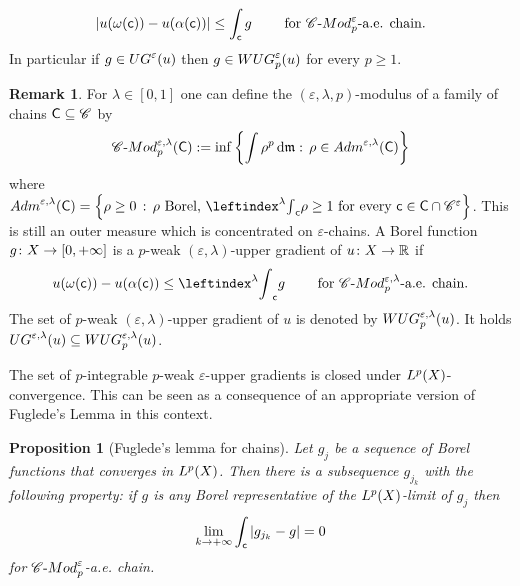 \documentclass[12pt]{amsart}
\newcommand{\R}{\mathbb{R}}
\renewcommand{\d}{{\mathrm d}}
\newcommand{\X}{{\rm X}}
\newcommand{\mm}{\mathfrak m}
\newtheorem{proposition}[theorem]{Proposition}
\theoremstyle{definition}
\newtheorem{remark}[theorem]{Remark}
\newcommand{\cModepsilon}[2]{{\mathscr C}\text{-}{\rm Mod}_{#2}^{#1}}
\newcommand{\sfc}{{\sf c}}
\newcommand{\sfC}{{\sf C}}
\newcommand{\Chain}[1]{\mathscr{C}^{#1}}
\newcommand{\UG}[1]{{\rm UG}^{#1}}
\newcommand{\WUG}[2]{{\rm WUG}_{#1}^{#2}}
\begin{document}
    \begin{equation*}
        \vert u(\omega(\sfc))-u(\alpha(\sfc)) \vert \le \int_{\sfc} g \qquad \text{ for }\cModepsilon{\varepsilon}{p}\text{-a.e. chain.}
    \end{equation*}
%
In particular if $g \in \UG{\varepsilon}(u)$ then $g\in \WUG{p}{\varepsilon}(u)$ for every $p\ge 1$.
%
\begin{remark}
    For $\lambda \in [0,1]$ one can define the $(\varepsilon, \lambda, p)$-modulus of a family of chains $\sfC \subseteq \Chain{}$ by
\begin{equation*}
    \cModepsilon{\varepsilon,\lambda}{p}({\sf C}):=\inf \left\{ \int \rho^p\,\d\mm:\, \rho \in {\rm Adm}^{\varepsilon, \lambda}({\sfC})\right\}
\end{equation*}
where ${\rm Adm}^{\varepsilon, \lambda}({\sfC})=\left\{ \rho \ge 0\,:\, \rho \text{ Borel, }\leftindex^\lambda{\int}_{\sfc} \rho \ge 1 \text{ for every } \sfc \in {\sfC} \cap \Chain{\varepsilon} \right\}$. This is still an outer measure which is concentrated on $\varepsilon$-chains. A Borel function $g \colon \X \to [0,+\infty]$ is a $p$-weak $(\varepsilon, \lambda)$-upper gradient of $u\colon \X \to \R$ if
    \begin{equation*}
        u(\omega(\sfc))-u(\alpha(\sfc)) \le \leftindex^\lambda{\int}_{\sfc} g \qquad \text{ for }\cModepsilon{\varepsilon,\lambda}{p}\text{-a.e. chain.}
    \end{equation*}
The set of $p$-weak $(\varepsilon, \lambda)$-upper gradient of $u$ is denoted by $\WUG{p}{\varepsilon, \lambda}(u)$. It holds $\UG{\varepsilon, \lambda}(u) \subseteq \WUG{p}{\varepsilon, \lambda}(u)$.
\end{remark}
%
The set of $p$-integrable $p$-weak $\varepsilon$-upper gradients is closed under $L^p(\X)$-convergence. This can be seen as a consequence of an appropriate version of  Fuglede's Lemma in this context.
\begin{proposition}[Fuglede's lemma for chains]
\label{prop:Fuglede's-lemma}
    Let $g_j$ be a sequence of Borel functions that converges in $L^p(\X)$. Then there is a subsequence $g_{j_k}$ with the following property: if $g$ is any Borel representative of the $L^p(\X)$-limit of $g_j$ then
    $$\lim_{k\to +\infty} \int_{\sfc} \vert g_{j_k} - g\vert = 0$$
    for $\cModepsilon{\varepsilon}{p}$-a.e. chain.
\end{proposition}
\end{document}
